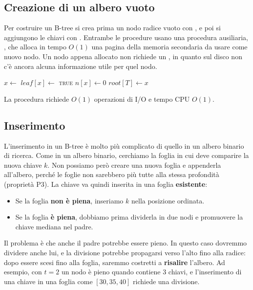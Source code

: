 \subsection{Creazione di un albero vuoto}\label{sec:btree-create}
Per costruire un B-tree si crea prima un nodo radice vuoto con \BTreeCreate{}, e poi si aggiungono le chiavi con \BTreeInsert{}. Entrambe le procedure usano una procedura ausiliaria, \AllocateNode{}, che alloca in tempo $O(1)$ una pagina della memoria secondaria da usare come nuovo nodo. Un nodo appena allocato non richiede un \PageRead{}, in quanto sul disco non c'è ancora alcuna informazione utile per quel nodo.

\begin{algorithm}[htbp]
\caption{La creazione di un B-tree vuoto: la radice è una foglia senza chiavi.}\label{alg:btree-create}
\begin{algorithmic}[1]
  \State $x \gets$ 
  \State $\mathit{leaf}[x] \gets$ \textsc{true}
  \State $n[x] \gets 0$
  \State {}
  \State $\mathit{root}[T] \gets x$
\EndProcedure
\end{algorithmic}
\end{algorithm}

La procedura richiede $O(1)$ operazioni di I/O e tempo CPU $O(1)$.

\subsection{Inserimento}\label{sec:btree-insert}
L'inserimento in un B-tree è molto più complicato di quello in un albero binario di ricerca. Come in un albero binario, cerchiamo la foglia in cui deve comparire la nuova chiave $k$. Non possiamo però creare una nuova foglia e appenderla all'albero, perché le foglie non sarebbero più tutte alla stessa profondità (proprietà P3). La chiave va quindi inserita in una foglia \textbf{esistente}:
\begin{itemize}
    \item Se la foglia \textbf{non è piena}, inseriamo $k$ nella posizione ordinata.
    \item Se la foglia \textbf{è piena}, dobbiamo prima dividerla in due nodi e promuovere la chiave mediana nel padre.
\end{itemize}
Il problema è che anche il padre potrebbe essere pieno. In questo caso dovremmo dividere anche lui, e la divisione potrebbe propagarsi verso l'alto fino alla radice: dopo essere scesi fino alla foglia, saremmo costretti a \textbf{risalire} l'albero. Ad esempio, con $t = 2$ un nodo è pieno quando contiene $3$ chiavi, e l'inserimento di una chiave in una foglia come $[30, 35, 40]$ richiede una divisione.

